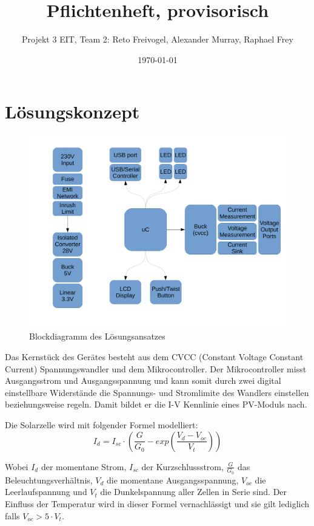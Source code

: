 \documentclass{article}
\title{Pflichtenheft, provisorisch}
\date{\today}
\author{Projekt 3 EIT, Team 2: Reto Freivogel, Alexander Murray, Raphael Frey}
\begin{document}
\maketitle

\section{L\"osungskonzept}
\begin{figure}[h!]
    \begin{centering}
    \includegraphics[width=.667\textwidth]{grob-blockdiagramm.pdf}
    \caption{Blockdiagramm des L\"osungsansatzes}
    \end{centering}
\end{figure}

Das  Kernst\"uck   des  Ger\"ates   besteht  aus  dem   CVCC  (Constant Voltage
Constant Current) Spannungswandler und   dem  Mikrocontroller. Der   Mikrocontroller
misst  Ausgangsstrom   und Ausgangsspannung und kann somit durch
zwei  digital   einstellbare  Widerst\"ande  die  Spannungs-  und
Stromlimite des  Wandlers einstellen beziehungsweise regeln. Damit bildet er  die I-V Kennlinie  eines PV-Moduls
nach.

Die Solarzelle wird mit folgender Formel modelliert:
\begin{equation}
I_d = I_{sc} \cdot \left(\frac{G}{G_0} - exp\left(\frac{V_d-V_{oc}}{V_t}\right)\right)
\end{equation}

Wobei   $I_{d}$   der   momentane  Strom,   $I_{sc}$   der   Kurzschlussstrom,
$\frac{G}{G_0}$    das   Beleuchtungsverh\"altnis,    $V_d$   die    momentane
Ausgangsspannung, $V_{oc}$  die Leerlaufspannung und $V_t$  die Dunkelspannung
aller Zellen in Serie sind. Der Einfluss der Temperatur wird in dieser Formel
vernachl\"assigt und sie gilt lediglich falls $V_{oc} > 5 \cdot V_t$.
\end{document}
